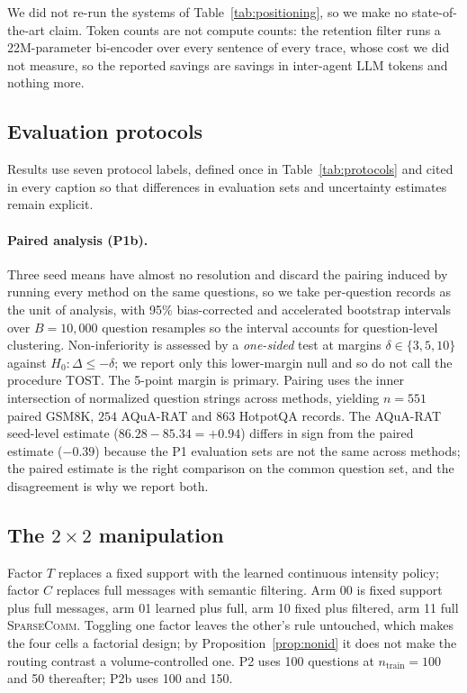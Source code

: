 \documentclass[11pt]{article}
\newcommand{\sys}{\textsc{SparseComm}\xspace}
\begin{document}
We did not re-run the systems of Table~\ref{tab:positioning}, so we make no
state-of-the-art claim. Token counts are not compute counts: the retention
filter runs a 22M-parameter bi-encoder over every sentence of every trace, whose
cost we did not measure, so the reported savings are savings in inter-agent LLM
tokens and nothing more.

\subsection{Evaluation protocols}
\label{sec:protocols}

Results use seven protocol labels, defined once in Table~\ref{tab:protocols} and
cited in every caption so that differences in evaluation sets and uncertainty
estimates remain explicit.


\paragraph{Paired analysis (P1b).}
Three seed means have almost no resolution and discard the pairing induced by
running every method on the same questions, so we take per-question records as
the unit of analysis, with 95\% bias-corrected and accelerated bootstrap
intervals over $B=10{,}000$ question resamples so the interval accounts for
question-level clustering. Non-inferiority is assessed by a \emph{one-sided}
test at margins $\delta\in\{3,5,10\}$ against $H_0:\Delta\le-\delta$; we report
only this lower-margin null and so do not call the procedure TOST. The 5-point
margin is primary. Pairing uses the inner intersection of normalized
question strings across methods, yielding $n=551$ paired GSM8K, $254$ AQuA-RAT
and $863$ HotpotQA records. The AQuA-RAT seed-level estimate
($86.28-85.34=+0.94$) differs in sign from the paired estimate ($-0.39$) because
the P1 evaluation sets are not the same across methods; the paired estimate is
the right comparison on the common question set, and the disagreement is why we
report both.

\subsection{The $2\times2$ manipulation}
\label{sec:factorial}

Factor $T$ replaces a fixed support with the learned continuous intensity
policy; factor $C$ replaces full messages with semantic filtering. Arm 00 is
fixed support plus full messages, arm 01 learned plus full, arm 10 fixed plus
filtered, arm 11 full \sys. Toggling one factor leaves the other's
rule untouched, which makes the four cells a factorial design; by
Proposition~\ref{prop:nonid} it does not make the routing contrast a
volume-controlled one. P2 uses 100 questions at $n_{\mathrm{train}}=100$ and 50 thereafter; P2b uses 100
and 150.
\end{document}
